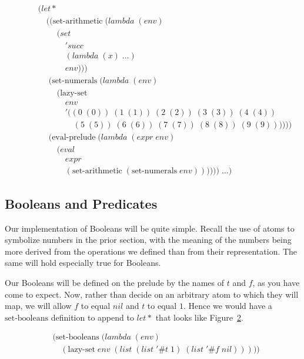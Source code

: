 \begin{figure}[htp]
\footnotesize
\caption{}\label{fig:evalPreludeExtension}
\begin{align*}
& (let* \; 
\\& \quad ((\text{set-arithmetic} \; (lambda \; (env)
\\& \qquad \; (set
\\& \qquad \quad \; 'succ
\\& \qquad \quad \; (lambda \; (x) \; \dots)
\\& \qquad \quad \; env)))
\\& \quad \; (\text{set-numerals} \; (lambda \; (env) \; 
\\& \qquad \; (\text{lazy-set} \; 
\\& \qquad \quad \; env \; 
\\& \qquad \quad \; '((0 \; (0)) \; (1 \; (1)) \; (2 \; (2)) \; (3 \; (3)) \; (4 \; (4)) \; 
\\& \qquad \qquad \; (5 \; (5)) \; (6 \; (6)) \; (7 \; (7)) \; (8 \; (8)) \; (9 \; (9))))))
\\& \quad \; (\text{eval-prelude} \; (lambda \; (expr \; env)
\\& \qquad \; (eval \; 
\\& \qquad \quad \; expr
\\& \qquad \quad \; (\text{set-arithmetic} \; (\text{set-numerals} \; env)))))) \; \dots)
\end{align*}
\end{figure}

\subsection{Booleans and Predicates}
Our implementation of Booleans will be quite simple. Recall the use of atoms 
to symbolize numbers in the prior section, with the meaning of the numbers 
being more derived from the operations we defined than from their 
representation. The same will hold especially true for Booleans.

Our Booleans will be defined on the prelude by the names of $t$ and $f$, as 
you have come to expect. Now, rather than decide on an arbitrary atom to 
which they will map, we will allow $f$ to equal $nil$ and $t$ to equal $1$. 
Hence we would have a $\text{set-booleans}$ definition to append to $let*$ that 
looks like Figure~\ref{fig:setBooleansDef}.

\begin{figure}[htp]
\footnotesize
\caption{}\label{fig:setBooleansDef}
\begin{align*}
& (\text{set-booleans} \; (lambda \; (env)
\\& \quad (\text{lazy-set} \; env \; (list \; (list \; '\#t \; 1) \; (list \; '\#f \; nil)))))
\end{align*}
\end{figure}

